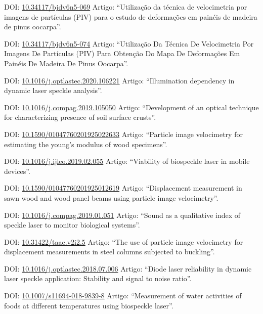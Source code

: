 \documentclass[11pt,a4paper,sans]{moderncv} %
\newcommand{\doiurl}[1]{\href{https://doi.org/#1}{#1}}
\begin{document}
	      {DOI: \doiurl{10.34117/bjdv6n5-069}}{}{}
	      {Artigo: ``Utilização da técnica de velocimetria por imagens de partículas (PIV) para o estudo de deformações em painéis de madeira de pinus oocarpa''.}


	      {DOI: \doiurl{10.34117/bjdv6n5-074}}{}{}
	      {Artigo: ``Utilização Da Técnica De Velocimetria Por Imagens De Partículas (PIV) Para Obtenção Do Mapa De Deformações Em Painéis De Madeira De Pinus Oocarpa''.}

	      {DOI: \doiurl{10.1016/j.optlastec.2020.106221}}{}{}
	      {Artigo: ``Illumination dependency in dynamic laser speckle analysis''.}


	      {DOI: \doiurl{10.1016/j.compag.2019.105050}}{}{}
	      {Artigo: ``Development of an optical technique for characterizing presence of soil surface crusts''.}


	      {DOI: \doiurl{10.1590/01047760201925022633}}{}{}
	      {Artigo: ``Particle image velocimetry for estimating the young’s modulus of wood specimens''.}

	      {DOI: \doiurl{10.1016/j.ijleo.2019.02.055}}{}{}
	      {Artigo: ``Viability of biospeckle laser in mobile devices''.}

	      {DOI: \doiurl{10.1590/01047760201925012619}}{}{}
	      {Artigo: ``Displacement measurement in sawn wood and wood panel beams using particle image velocimetry''.}

	      {DOI: \doiurl{10.1016/j.compag.2019.01.051}}{}{}
	      {Artigo: ``Sound as a qualitative index of speckle laser to monitor biological systems''.}

	      {DOI: \doiurl{10.31422/taae.v2i2.5}}{}{}
	      {Artigo: ``The use of particle image velocimetry for displacement measurements in steel columns subjected to buckling''.}
	      
	      {DOI: \doiurl{10.1016/j.optlastec.2018.07.006}}{}{}
	      {Artigo: ``Diode laser reliability in dynamic laser speckle application: Stability and signal to noise ratio''.}
	      
	      {DOI: \doiurl{10.1007/s11694-018-9839-8}}{}{}
	      {Artigo: ``Measurement of water activities of foods at different temperatures using biospeckle laser''.}
\end{document}
